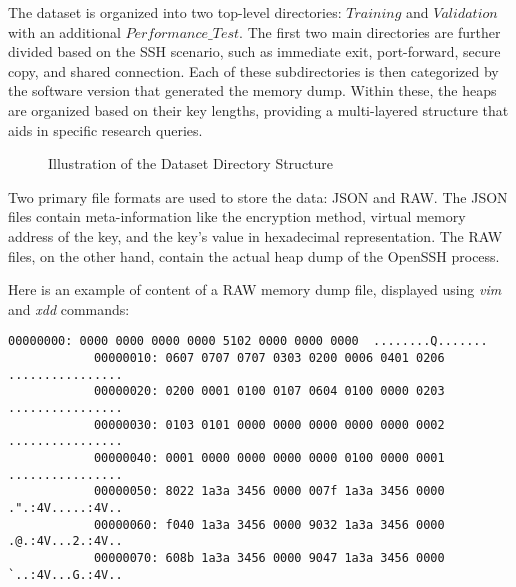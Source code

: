     \begin{minipage}{\dimexpr\linewidth-20pt}
        The dataset is organized into two top-level directories: $Training$ and $Validation$ with an additional $Performance\_Test$. The first two main directories are further divided based on the SSH scenario, such as immediate exit, port-forward, secure copy, and shared connection. Each of these subdirectories is then categorized by the software version that generated the memory dump. Within these, the heaps are organized based on their key lengths, providing a multi-layered structure that aids in specific research queries.

        \begin{figure}[H]
            \centering
            \caption{Illustration of the Dataset Directory Structure}
            \label{fig:dataset_structure}
            \begin{minipage}{0.6\textwidth}
        \end{minipage}
        \end{figure}
    \end{minipage}

    Two primary file formats are used to store the data: JSON and RAW. The JSON files contain meta-information like the encryption method, virtual memory address of the key, and the key's value in hexadecimal representation. The RAW files, on the other hand, contain the actual heap dump of the OpenSSH process.

    \begin{minipage}{\dimexpr\linewidth-20pt}
        Here is an example of content of a RAW memory dump file, displayed using \textit{vim} and \textit{xdd} commands:

        \begin{lstlisting}[style=hexdump, caption={Hex Dump from \textit{Training/basic/V\_7\_8\_P1/16/5070-1643978841-heap.raw}}]
            00000000: 0000 0000 0000 0000 5102 0000 0000 0000  ........Q.......
            00000010: 0607 0707 0707 0303 0200 0006 0401 0206  ................
            00000020: 0200 0001 0100 0107 0604 0100 0000 0203  ................
            00000030: 0103 0101 0000 0000 0000 0000 0000 0002  ................
            00000040: 0001 0000 0000 0000 0000 0100 0000 0001  ................
            00000050: 8022 1a3a 3456 0000 007f 1a3a 3456 0000  .".:4V.....:4V..
            00000060: f040 1a3a 3456 0000 9032 1a3a 3456 0000  .@.:4V...2.:4V..
            00000070: 608b 1a3a 3456 0000 9047 1a3a 3456 0000  `..:4V...G.:4V..
        \end{lstlisting}
    \end{minipage}

